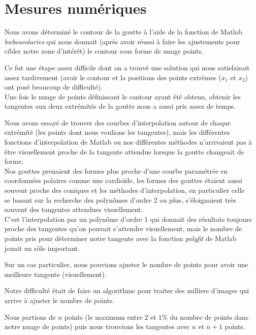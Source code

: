 \documentclass[french]{article}
\begin{document}
\section{Mesures numériques}

Nous avons déterminé le contour de la goutte à l'aide de la fonction de Matlab \emph{bwboundaries} qui nous donnait (après avoir réussi à faire les ajustements pour cibler notre zone d'intérêt) le contour sous forme de nuage points.

Ce fut une étape assez difficile dont on a trouvé une solution qui nous satisfaisait assez tardivement (avoir le contour et la positions des points extrêmes ($x_{1}$ et $x_{2}$) ont posé beaucoup de difficulté).  \\

Une fois le nuage de points définissant le contour ayant été obtenu, obtenir les tangentes aux deux extrémités de la goutte nous a aussi pris assez de temps.

Nous avons essayé de trouver des courbes d'interpolation autour de chaque extrémité (les points dont nous voulions les tangentes), mais les différentes fonctions d'interpolation de Matlab ou nos différentes méthodes n'arrivaient pas à être visuellement proche de la tangente attendue lorsque la goutte changeait de forme.\\

Nos gouttes prenaient des formes plus proche d'une courbe paramétrée en coordonnées polaires comme une cardioïde, les formes des gouttes étaient aussi souvent proche des coniques et les méthodes d'interpolation, en particulier celle se basant sur la recherche des polynômes d'ordre 2 ou plus, s'éloignaient très souvent des tangentes attendues visuellement.\\

C'est l'interpolation par un polynôme d'ordre 1 qui donnait des résultats toujours proche des tangentes qu'on pouvait s'attendre visuellement, mais le nombre de points pris pour déterminer notre tangente avec la fonction \emph{polyfit} de Matlab jouait un rôle important.

Sur un cas particulier, nous pouvions ajuster le nombre de points pour avoir une meilleure tangente (visuellement).

Notre difficulté était de faire un algorithme pour traiter des milliers d'images qui arrive à ajuster le nombre de points.

Nous partions de $n$ points (le maximum entre 2 et $1\%$ du nombre de points dans notre nuage de points) puis nous trouvions les tangentes avec $n$ et $n+1$ points.
\end{document}

